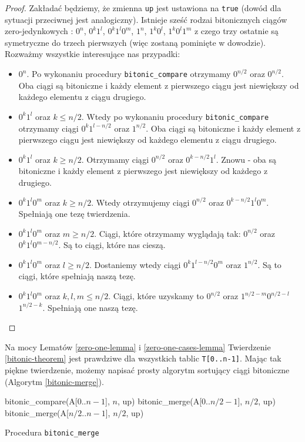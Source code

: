 \begin{proof}
 Zakładać będziemy, że zmienna \texttt{up} jest ustawiona na \texttt{true} (dowód dla sytuacji przeciwnej jest analogiczny).
 Istnieje sześć rodzai bitonicznych ciągów zero-jedynkowych : $0^n$, $0^k1^l$, $0^k1^l0^m$, $1^n$, $1^k0^l$, $1^k0^l1^m$ z czego trzy ostatnie są symetryczne do trzech pierwszych (więc zostaną pominięte w dowodzie).
 Rozważmy wszystkie interesujące nas przypadki:
 \begin{itemize}
  \item $0^n$.
   Po wykonaniu procedury \texttt{bitonic\_compare} otrzymamy $0^{n/2}$ oraz $0^{n/2}$.
   Oba ciągi są bitoniczne i każdy element z pierwszego ciągu jest niewiększy od każdego elementu z ciągu drugiego.
  \item $0^k1^l$ oraz $k \leq n/2$.
   Wtedy po wykonaniu procedury \texttt{bitonic\_compare} otrzymamy ciągi $0^k1^{l-n/2}$ oraz $1^{n/2}$.
   Oba ciągi są bitoniczne i każdy element z pierwszego ciągu jest niewiększy od każdego elementu z ciągu drugiego.
  \item $0^k1^l$ oraz $k \geq n/2$.
   Otrzymamy ciągi $0^{n/2}$ oraz $0^{k-n/2}1^l$.
   Znowu - oba są bitoniczne i każdy element z pierwszego jest niewiększy od każdego z drugiego.
  \item $0^k1^l0^m$ oraz $k \geq n/2$.
   Wtedy otrzymujemy ciągi $0^{n/2}$ oraz $0^{k-n/2}1^l0^m$.
   Spełniają one tezę twierdzenia.
  \item $0^k1^l0^m$ oraz $m \geq n/2$.
   Ciągi, które otrzymamy wyglądają tak: $0^{n/2}$ oraz $0^k1^l0^{m-n/2}$.
   Są to ciągi, które nas cieszą.
  \item $0^k1^l0^m$ oraz $l \geq n/2$.
   Dostaniemy wtedy ciągi $0^k1^{l-n/2}0^m$ oraz $1^{n/2}$.
   Są to ciągi, które spełniają naszą tezę.
  \item $0^k1^l0^m$ oraz $k, l, m \leq n/2$.
   Ciągi, które uzyskamy to $0^{n/2}$ oraz $1^{n/2-m}0^{n/2-l}$ $1^{n/2-k}$.
   Spełniają one naszą tezę.
 \end{itemize}
\end{proof}

Na mocy Lematów \ref{zero-one-lemma} i \ref{zero-one-cases-lemma} Twierdzenie \ref{bitonic-theorem} jest prawdziwe dla wszystkich tablic \texttt{T[0..n-1]}.
Mając tak piękne twierdzenie, możemy napisać prosty algorytm sortujący ciągi bitoniczne (Algorytm \ref{bitonic-merge}).

\begin{algorithm}[h]
  \DontPrintSemicolon
  
  
  
   {
     bitonic\_compare(A[$0$..$n-1$], $n$,   up)\;
     bitonic\_merge(A[$0$..$n/2-1$], $n/2$, up)\;
     bitonic\_merge(A[$n/2$..$n-1$], $n/2$, up)\;
   }
  \caption{Procedura \texttt{bitonic\_merge}}
  \label{bitonic-merge}
\end{algorithm}

